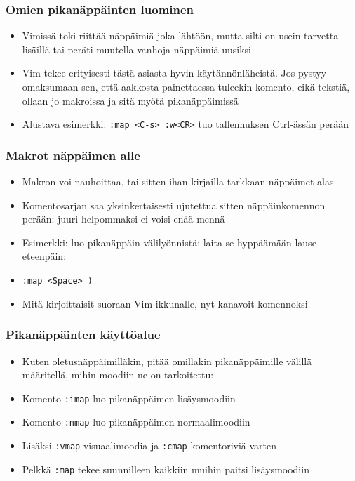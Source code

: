 \documentclass[]{beamer}
\newcommand{\Tohj}[1]{\texttt{#1}}
\newcommand{\com}[1]{{\color{blue!50!black}\Tohj{#1}} \!\!}
\begin{document}
\begin{frame}
    \frametitle{Omien pikanäppäinten luominen}
    \begin{itemize}
        \item Vimissä toki riittää näppäimiä joka lähtöön, mutta silti on usein tarvetta lisäillä tai peräti muutella vanhoja näppäimiä uusiksi
        \item Vim tekee erityisesti tästä asiasta hyvin käytännönläheistä. Jos pystyy omaksumaan sen, että aakkosta painettaessa tuleekin komento, eikä tekstiä, ollaan jo makroissa ja sitä myötä pikanäppäimissä
        \pause
        \item Alustava esimerkki: \com{:map <C-s> :w<CR>} tuo tallennuksen Ctrl-ässän perään
    \end{itemize}
\end{frame}

\begin{frame}
    \frametitle{Makrot näppäimen alle}
    \begin{itemize}
        \item Makron voi nauhoittaa, tai sitten ihan kirjailla tarkkaan näppäimet alas
        \item Komentosarjan saa yksinkertaisesti ujutettua sitten näppäinkomennon perään: juuri helpommaksi ei voisi enää mennä
        \pause
        \item Esimerkki: luo pikanäppäin välilyönnistä: laita se hyppäämään lause eteenpäin:
        \item \com{:map <Space> )}
        \item Mitä kirjoittaisit suoraan Vim-ikkunalle, nyt kanavoit komennoksi
    \end{itemize}
\end{frame}

\begin{frame}
    \frametitle{Pikanäppäinten käyttöalue}
    \begin{itemize}
        \item Kuten oletusnäppäimilläkin, pitää omillakin pikanäppäimille välillä määritellä, mihin moodiin ne on tarkoitettu:
        \pause
        \item Komento \com{:imap} luo pikanäppäimen lisäysmoodiin
        \item Komento \com{:nmap} luo pikanäppäimen normaalimoodiin
        \pause
        \item Lisäksi \com{:vmap} visuaalimoodia ja \com{:cmap} komentoriviä varten
        \item Pelkkä \com{:map} tekee suunnilleen kaikkiin muihin paitsi lisäysmoodiin
    \end{itemize}
\end{frame}
\end{document}

